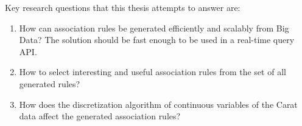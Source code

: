 Key research questions that this thesis attempts to answer are:

\begin{enumerate}
	\item How can association rules be generated efficiently and scalably from Big Data? The solution should be fast enough to be used in a real-time query API. 
	
	\item How to select interesting and useful association rules from the set of all generated rules? 
	
	\item How does the discretization algorithm of continuous variables of the Carat data affect the generated association rules? 
\end{enumerate}  

